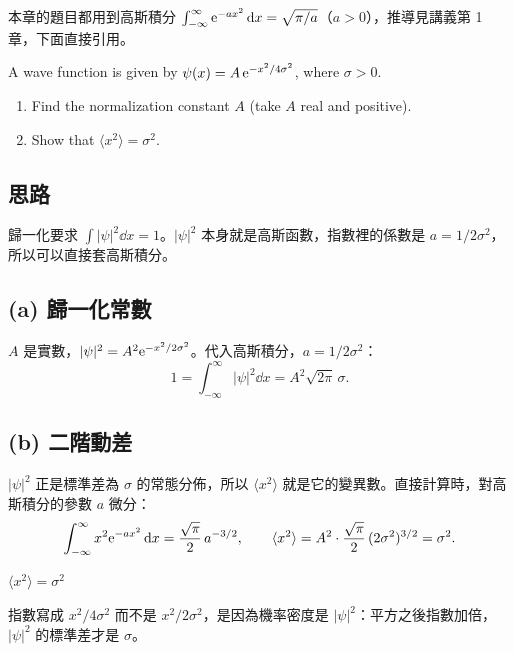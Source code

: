 \documentclass[10pt,a4paper]{article}
\begin{document}
\tableofcontents
{}

\begin{chapterintro}
本章的題目都用到高斯積分 $\int_{-\infty}^{\infty}\mathrm{e}^{-ax^2}\mathop{}\!\mathrm{d} x=\sqrt{\pi/a}$（$a>0$），推導見講義第 1 章，下面直接引用。
\end{chapterintro}


\begin{statement}
A wave function is given by $\psi(x)=A\,\mathrm{e}^{-x^2/4\sigma^2}$, where $\sigma>0$.
\begin{enumerate}
  \item[(a)] Find the normalization constant $A$ (take $A$ real and positive).
  \item[(b)] Show that $\langle x^2\rangle=\sigma^2$.
\end{enumerate}
\end{statement}

\subsection*{思路}
歸一化要求 $\int|\psi|^2\dd x=1$。$|\psi|^2$ 本身就是高斯函數，指數裡的係數是 $a=1/2\sigma^2$，所以可以直接套高斯積分。

\subsection*{(a) 歸一化常數}
$A$ 是實數，$|\psi|^2=A^2\mathrm{e}^{-x^2/2\sigma^2}$。代入高斯積分，$a=1/2\sigma^2$：
\[
  1=\int_{-\infty}^{\infty}|\psi|^2\dd x=A^2\sqrt{2\pi}\,\sigma .
\]

\subsection*{(b) 二階動差}
$|\psi|^2$ 正是標準差為 $\sigma$ 的常態分佈，所以 $\langle x^2\rangle$ 就是它的變異數。直接計算時，對高斯積分的參數 $a$ 微分：
\[
  \int_{-\infty}^{\infty}x^2\mathrm{e}^{-ax^2}\mathop{}\!\mathrm{d} x=\frac{\sqrt\pi}{2}\,a^{-3/2},
  \qquad
  \langle x^2\rangle=A^2\cdot\frac{\sqrt\pi}{2}\,(2\sigma^2)^{3/2}=\sigma^2 .
\]
\begin{resultbox}[答案 (b)]
$\langle x^2\rangle=\sigma^2$
\end{resultbox}

\begin{notebox}
指數寫成 $x^2/4\sigma^2$ 而不是 $x^2/2\sigma^2$，是因為機率密度是 $|\psi|^2$：平方之後指數加倍，$|\psi|^2$ 的標準差才是 $\sigma$。
\end{notebox}
\end{document}
